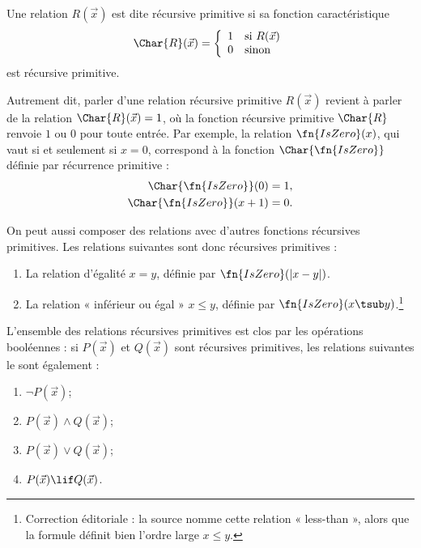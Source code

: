 \documentclass[../../../include/open-logic-section]{subfiles}
\begin{document}

\begin{defn}
Une relation $R(\vec x)$ est dite récursive primitive si sa
fonction caractéristique
\[
\Char{R}(\vec x) = \left\{
  \begin{array}{ll}
  1 & \mbox{si $R(\vec x)$} \\
  0 & \mbox{sinon}
  \end{array}
\right.
\]
est récursive primitive.
\end{defn}

Autrement dit, parler d'une relation récursive primitive
$R(\vec x)$ revient à parler de la relation
$\Char{R}(\vec x)=1$, où la fonction récursive primitive
$\Char{R}$ renvoie $1$ ou $0$ pour toute entrée. Par exemple,
la relation $\fn{IsZero}(x)$, qui vaut si et seulement si
$x=0$, correspond à la fonction $\Char{\fn{IsZero}}$
définie par récurrence primitive :
\begin{align*}
\Char{\fn{IsZero}}(0) & = 1,\\
\Char{\fn{IsZero}}(x+1) & = 0.
\end{align*}

On peut aussi composer des relations avec d'autres fonctions
récursives primitives. Les relations suivantes sont donc
récursives primitives :
\begin{enumerate}
\item La relation d'égalité $x=y$, définie par
  $\fn{IsZero}(\left|x-y\right|)$.
\item La relation « inférieur ou égal » $x\leq y$, définie par
  $\fn{IsZero}(x\tsub y)$.\footnote{Correction éditoriale : la source nomme cette relation « less-than », alors que la formule définit bien l'ordre large $x\leq y$.}
\end{enumerate}

\begin{prop}
  L'ensemble des relations récursives primitives est clos
  par les opérations booléennes : si $P(\vec x)$ et
  $Q(\vec x)$ sont récursives primitives, les relations
  suivantes le sont également :
  \begin{enumerate}
  \item $\lnot P(\vec x)$;
  \item $P(\vec x)\land Q(\vec x)$;
  \item $P(\vec x)\lor Q(\vec x)$;
  \item $P(\vec x)\lif Q(\vec x)$.
  \end{enumerate}
\end{prop}
\end{document}
